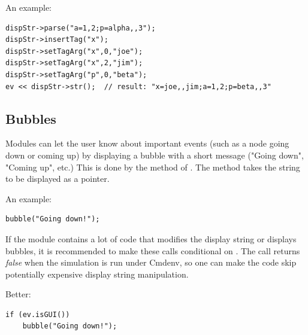 An example:

\begin{verbatim}
dispStr->parse("a=1,2;p=alpha,,3");
dispStr->insertTag("x");
dispStr->setTagArg("x",0,"joe");
dispStr->setTagArg("x",2,"jim");
dispStr->setTagArg("p",0,"beta");
ev << dispStr->str();  // result: "x=joe,,jim;a=1,2;p=beta,,3"
\end{verbatim}

\subsection{Bubbles}

Modules can let the user know about important events (such as a node
going down or coming up) by displaying a bubble with a short message
("Going down", "Coming up", etc.) This is done by the  method
of . The method takes the string to be displayed
as a  pointer.

An example:
\begin{verbatim}
bubble("Going down!");
\end{verbatim}

If the module contains a lot of code that modifies the display string or
displays bubbles, it is recommended to make these calls conditional
on . The  call returns \textit{false}
when the simulation is run under Cmdenv, so one can make the code skip
potentially expensive display string manipulation.

Better:
\begin{verbatim}
if (ev.isGUI())
    bubble("Going down!");
\end{verbatim}

